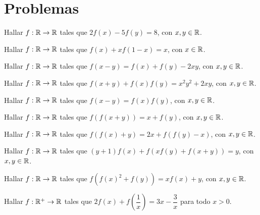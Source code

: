 \section{Problemas}

\begin{exercise}
    Hallar $f : \mathbb{R} \to \mathbb{R}$ tales que $2f(x) - 5f(y) = 8$, con $x, y \in \mathbb{R}$.
\end{exercise}

\begin{exercise}
    Hallar $f : \mathbb{R} \to \mathbb{R}$ tales que $f(x) + xf(1 - x) = x$, con $x \in \mathbb{R}$.
\end{exercise}

\begin{exercise}
    Hallar $f : \mathbb{R} \to \mathbb{R}$ tales que $f(x - y) = f(x) + f(y) - 2xy$, con $x, y \in \mathbb{R}$.
\end{exercise}

\begin{exercise}
    Hallar $f : \mathbb{R} \to \mathbb{R}$ tales que $f(x + y) + f(x)f(y) = x^2 y^2 + 2xy$, con $x, y \in \mathbb{R}$.
\end{exercise}

\begin{exercise}
    Hallar $f : \mathbb{R} \to \mathbb{R}$ tales que $f(x - y) = f(x)f(y)$, con $x, y \in \mathbb{R}$.
\end{exercise}

\begin{exercise}
    Hallar $f : \mathbb{R} \to \mathbb{R}$ tales que $f(f(x + y)) = x + f(y)$, con $x, y \in \mathbb{R}$.
\end{exercise}

\begin{exercise}
    Hallar $f : \mathbb{R} \to \mathbb{R}$ tales que $f(f(x) + y) = 2x + f(f(y) - x)$, con $x, y \in \mathbb{R}$.
\end{exercise}

\begin{exercise}
    Hallar $f : \mathbb{R} \to \mathbb{R}$ tales que $(y + 1)f(x) + f(x f(y) + f(x + y)) = y$, con $x, y \in \mathbb{R}$.
\end{exercise}

\begin{exercise}
    Hallar $f : \mathbb{R} \to \mathbb{R}$ tales que $f\left(f(x)^2 + f(y)\right) = xf(x) + y$, con $x, y \in \mathbb{R}$.
\end{exercise}

\begin{exercise}
    Hallar $f : \mathbb{R}^+ \to \mathbb{R}$ tales que $2f(x) + f\left(\dfrac{1}{x}\right) = 3x - \dfrac{3}{x}$ para todo $x > 0$.
\end{exercise}

